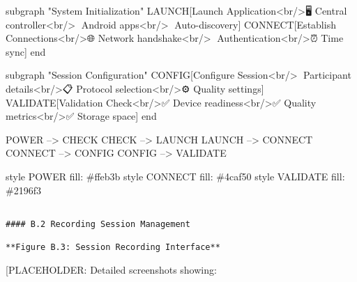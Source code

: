\documentclass[11pt,a4paper]{report}
\begin{document}
subgraph "System Initialization"
LAUNCH[Launch Application<br/>🖥️ Central controller<br/>📱 Android apps<br/>🔗 Auto-discovery]
CONNECT[Establish Connections<br/>🌐 Network handshake<br/>🔐 Authentication<br/>⏰ Time sync]
end

subgraph "Session Configuration"
CONFIG[Configure Session<br/>👤 Participant details<br/>📋 Protocol selection<br/>⚙️ Quality settings]
VALIDATE[Validation Check<br/>✅ Device readiness<br/>✅ Quality metrics<br/>✅ Storage space]
end

POWER --> CHECK
CHECK --> LAUNCH
LAUNCH --> CONNECT
CONNECT --> CONFIG
CONFIG --> VALIDATE

style POWER fill: \#ffeb3b
style CONNECT fill: \#4caf50
style VALIDATE fill: \#2196f3
\begin{verbatim}

#### B.2 Recording Session Management

**Figure B.3: Session Recording Interface**

\end{verbatim}
[PLACEHOLDER: Detailed screenshots showing:
\end{document}
